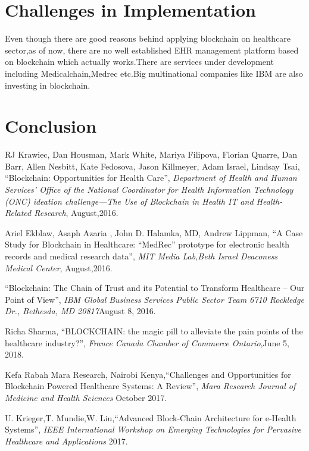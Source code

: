 \documentclass[12pt]{report}
\begin{document}
\chapter{Challenges in Implementation}
Even though there are good reasons behind applying blockchain on healthcare sector,as of now, there are no well established EHR management platform based on blockchain which actually works.There are services under development including Medicalchain,Medrec etc.Big multinational companies like IBM are also investing in blockchain.
\chapter{Conclusion}

\begin{thebibliography}{100} 

 RJ Krawiec, Dan Housman, Mark White, Mariya Filipova,
Florian Quarre, Dan Barr, Allen Nesbitt, Kate Fedosova,
Jason Killmeyer, Adam Israel, Lindsay Tsai, \textquotedblleft Blockchain:
Opportunities for Health Care\textquotedblright, \textit{Department of Health and Human Services’ Office of the National Coordinator for Health
Information Technology (ONC) ideation challenge—The Use of Blockchain in Health IT and Health-Related Research}, August,2016.


 Ariel Ekblaw, Asaph Azaria , John D. Halamka, MD, Andrew Lippman, \textquotedblleft A Case Study for Blockchain in Healthcare:
“MedRec” prototype for electronic health records and medical research data\textquotedblright, \textit{MIT Media Lab,Beth Israel Deaconess Medical Center}, August,2016.


 \textquotedblleft Blockchain: The Chain of Trust and its Potential to Transform Healthcare – Our Point of View\textquotedblright, \textit{IBM Global Business Services Public Sector Team 6710 Rockledge Dr., Bethesda, MD 20817}August 8, 2016.

 Richa Sharma, \textquotedblleft BLOCKCHAIN: the magic pill to alleviate the pain
points of the healthcare industry?\textquotedblright, \textit{France Canada Chamber of Commerce Ontario},June 5, 2018.

Kefa Rabah Mara Research, Nairobi Kenya,\textquotedblleft Challenges and Opportunities for Blockchain Powered Healthcare Systems: A Review\textquotedblright, \textit{Mara Research Journal of Medicine and Health Sciences} October 2017.

U. Krieger,T. Mundie,W. Liu,\textquotedblleft Advanced Block-Chain Architecture for e-Health Systems\textquotedblright, \textit{IEEE International
Workshop on Emerging Technologies for Pervasive Healthcare and Applications} 2017.



\end{thebibliography}
\end{document}
